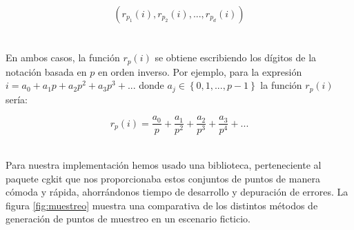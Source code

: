 \[ \left( r_{p_1}(i),  r_{p_2}(i), ...,  r_{p_d}(i) \right) \]\\~\\

En ambos casos, la función $r_p(i)$ se obtiene  escribiendo los dígitos de la notación basada en $p$ en orden inverso. Por ejemplo, para la expresión $i = a_0 + a_1 p + a_2 p^2 + a_3 p^3 + ... $ donde $a_j \in \left\lbrace 0, 1, ... , p-1 \right\rbrace$ la función $r_p(i)$ sería:

\[ r_p(i) = \frac{a_0}{p} + \frac{a_1}{p^2} + \frac{a_2}{p^3} + \frac{a_3}{p^4} + ...\]

\\

Para nuestra implementación hemos usado una biblioteca, perteneciente al paquete cgkit que nos proporcionaba estos conjuntos de puntos de manera cómoda y rápida, ahorrándonos tiempo de desarrollo y depuración de errores. La figura \ref{fig:muestreo} muestra una comparativa de los distintos métodos de generación de puntos de muestreo en un escenario ficticio.\\

